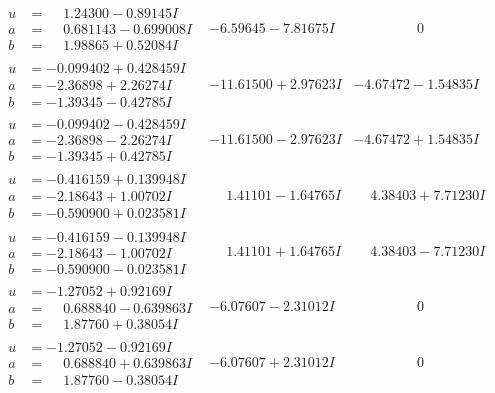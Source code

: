 \documentclass[1p]{elsarticle_modified}
\theoremstyle{definition}
\begin{document}
$$\begin{array}{c|c|c}
\begin{aligned}
u &= \phantom{-}1.24300 - 0.89145 I \\
a &= \phantom{-}0.681143 - 0.699008 I \\
b &= \phantom{-}1.98865 + 0.52084 I\end{aligned}
 & -6.59645 - 7.81675 I & \phantom{-0.000000 } 0 \\ \hline\begin{aligned}
u &= -0.099402 + 0.428459 I \\
a &= -2.36898 + 2.26274 I \\
b &= -1.39345 - 0.42785 I\end{aligned}
 & -11.61500 + 2.97623 I & -4.67472 - 1.54835 I \\ \hline\begin{aligned}
u &= -0.099402 - 0.428459 I \\
a &= -2.36898 - 2.26274 I \\
b &= -1.39345 + 0.42785 I\end{aligned}
 & -11.61500 - 2.97623 I & -4.67472 + 1.54835 I \\ \hline\begin{aligned}
u &= -0.416159 + 0.139948 I \\
a &= -2.18643 + 1.00702 I \\
b &= -0.590900 + 0.023581 I\end{aligned}
 & \phantom{-}1.41101 - 1.64765 I & \phantom{-}4.38403 + 7.71230 I \\ \hline\begin{aligned}
u &= -0.416159 - 0.139948 I \\
a &= -2.18643 - 1.00702 I \\
b &= -0.590900 - 0.023581 I\end{aligned}
 & \phantom{-}1.41101 + 1.64765 I & \phantom{-}4.38403 - 7.71230 I \\ \hline\begin{aligned}
u &= -1.27052 + 0.92169 I \\
a &= \phantom{-}0.688840 - 0.639863 I \\
b &= \phantom{-}1.87760 + 0.38054 I\end{aligned}
 & -6.07607 - 2.31012 I & \phantom{-0.000000 } 0 \\ \hline\begin{aligned}
u &= -1.27052 - 0.92169 I \\
a &= \phantom{-}0.688840 + 0.639863 I \\
b &= \phantom{-}1.87760 - 0.38054 I\end{aligned}
 & -6.07607 + 2.31012 I & \phantom{-0.000000 } 0\\

\end{array}$$
\end{document}
